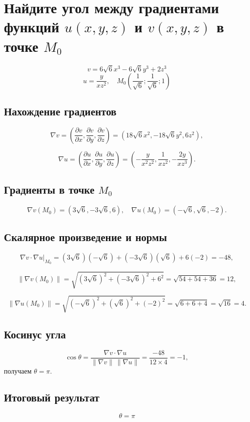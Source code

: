\section{Найдите угол между градиентами функций $u(x, y, z)$ и $v(x, y, z)$
в точке $M_0$}
\[
v = 6\sqrt{6}x^3 - 6\sqrt{6}y^3 + 2z^3
\]
\[
u = \frac{y}{xz^2},\quad M_0(\frac{1}{\sqrt{6}}; \frac{1}{\sqrt{6}}; 1)
\]

\subsection{Нахождение градиентов}

\[
\nabla v = (\frac{\partial v}{\partial x}, \frac{\partial v}{\partial y}, \frac{\partial v}{\partial z}) = (18\sqrt{6}x^2, -18\sqrt{6}y^2, 6z^2),
\]

\[
\nabla u = (\frac{\partial u}{\partial x}, \frac{\partial u}{\partial y}, \frac{\partial u}{\partial z}) = (-\frac{y}{x^2z^2}, \frac{1}{xz^2}, -\frac{2y}{xz^3}).
\]

\subsection{Градиенты в точке \(M_0\)}

\[
\nabla v(M_0) = (3\sqrt{6}, -3\sqrt{6}, 6), \quad \nabla u(M_0) = (-\sqrt{6}, \sqrt{6}, -2).
\]

\subsection{Скалярное произведение и нормы}

\[
\nabla v \cdot \nabla u \bigg|_{M_0} = (3\sqrt{6})(-\sqrt{6}) + (-3\sqrt{6})(\sqrt{6}) + 6(-2) = -48,
\]

\[
\|\nabla v(M_0)\| = \sqrt{(3\sqrt{6})^2 + (-3\sqrt{6})^2 + 6^2} = \sqrt{54 + 54 + 36} = 12,
\]

\[
\|\nabla u(M_0)\| = \sqrt{(-\sqrt{6})^2 + (\sqrt{6})^2 + (-2)^2} = \sqrt{6 + 6 + 4} = \sqrt{16} = 4.
\]

\subsection{Косинус угла}

\[
\cos\theta=\frac{\nabla v\cdot\nabla u}{\|\nabla v\|\,\|\nabla u\|} = \frac{-48}{12 \times 4} = -1,
\]
получаем \(\theta = \pi\).

\subsection{Итоговый результат}

\[\boxed{\theta = \pi}\]